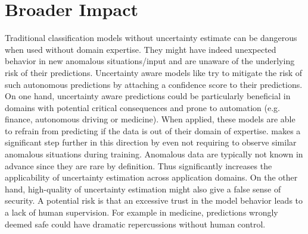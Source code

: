 \section*{Broader Impact}
\label{ethical_impact}

Traditional classification models without uncertainty estimate can be dangerous when used without domain expertise. They might have indeed unexpected behavior in new anomalous situations/input and are unaware of the underlying risk of their predictions. Uncertainty aware models like \oursacro try to mitigate the risk of such autonomous predictions by attaching a confidence score to their predictions. On one hand, uncertainty aware predictions could be particularly beneficial in domains with potential critical consequences and prone to automation (e.g. finance, autonomous driving or medicine). When applied, these models are able to refrain from predicting if the data is out of their domain of expertise. \ours makes a significant step further in this direction by even not requiring to observe similar anomalous situations during training. Anomalous data are typically not known in advance since they are rare by definition. Thus \ours significantly increases the applicability of uncertainty estimation across application domains. On the other hand, high-quality of uncertainty estimation might also give a false sense of security. A potential risk is that an excessive trust in the model behavior leads to a lack of human supervision. For example in medicine, predictions wrongly deemed safe could have dramatic repercussions without human control.